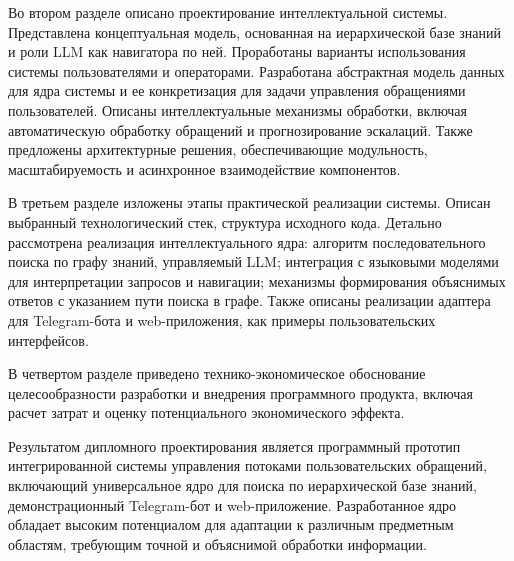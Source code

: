 Во втором разделе описано проектирование интеллектуальной системы. Представлена концептуальная модель, основанная на иерархической базе знаний и роли LLM как навигатора по ней. Проработаны варианты использования системы пользователями и операторами. Разработана абстрактная модель данных для ядра системы и ее конкретизация для задачи управления обращениями пользователей. Описаны интеллектуальные механизмы обработки, включая автоматическую обработку обращений и прогнозирование эскалаций. Также предложены архитектурные решения, обеспечивающие модульность, масштабируемость и асинхронное взаимодействие компонентов.

В третьем разделе изложены этапы практической реализации системы. Описан выбранный технологический стек, структура исходного кода. Детально рассмотрена реализация интеллектуального ядра: алгоритм последовательного поиска по графу знаний, управляемый LLM; интеграция с языковыми моделями для интерпретации запросов и навигации; механизмы формирования объяснимых ответов с указанием пути поиска в графе. Также описаны реализации адаптера для Telegram-бота и web-приложения, как примеры пользовательских интерфейсов.

В четвертом разделе приведено технико-экономическое обоснование целесообразности разработки и внедрения программного продукта, включая расчет затрат и оценку потенциального экономического эффекта.

Результатом дипломного проектирования является программный прототип интегрированной системы управления потоками пользовательских обращений, включающий универсальное ядро для поиска по иерархической базе знаний, демонстрационный Telegram-бот и web-приложение. Разработанное ядро обладает высоким потенциалом для адаптации к различным предметным областям, требующим точной и объяснимой обработки информации.

\clearpage